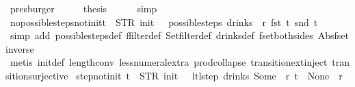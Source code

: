 \begin{isabellebody}
\ presburger\isanewline
\ \ \isamarkupfalse%
\ \isamarkupfalse%
\ {\isacharquery}thesis\isanewline
\ \ \ \ \isamarkupfalse%
\ simp\isanewline
{}\isamarkupfalse%
%
\endisatagproof
{\isafoldproof}%
%
\isadelimproof
\isanewline
%
\endisadelimproof
\isanewline
{}\isamarkupfalse%
\ no{\isacharunderscore}possible{\isacharunderscore}steps{\isacharunderscore}not{\isacharunderscore}init{\isacharcolon}{\isachardoublequoteopen}t\ {\isasymnoteq}\ {\isacharparenleft}STR\ {\isacharprime}{\isacharprime}init{\isacharprime}{\isacharprime}{\isacharcomma}\ {\isacharbrackleft}{\isacharbrackright}{\isacharparenright}\ {\isasymLongrightarrow}\ possible{\isacharunderscore}steps\ drinks\ {}\ r\ {\isacharparenleft}fst\ t{\isacharparenright}\ {\isacharparenleft}snd\ t{\isacharparenright}\ {\isacharequal}\ {\isacharbraceleft}{\isacharbar}{\isacharbar}{\isacharbraceright}{\isachardoublequoteclose}\isanewline
%
\isadelimproof
\ \ %
\endisadelimproof
%
\isatagproof
{}\isamarkupfalse%
\ {\isacharparenleft}simp\ add{\isacharcolon}\ possible{\isacharunderscore}steps{\isacharunderscore}def\ ffilter{\isacharunderscore}def\ Set{\isachardot}filter{\isacharunderscore}def\ drinks{\isacharunderscore}def\ fset{\isacharunderscore}both{\isacharunderscore}sides\ Abs{\isacharunderscore}fset{\isacharunderscore}inverse{\isacharparenright}\isanewline
\ \ \isamarkupfalse%
\ {\isacharparenleft}metis\ init{\isacharunderscore}def\ length{\isacharunderscore}{}{\isacharunderscore}conv\ less{\isacharunderscore}numeral{\isacharunderscore}extra{\isacharparenleft}{}{\isacharparenright}\ prod{\isachardot}collapse\ transition{\isachardot}ext{\isacharunderscore}inject\ transition{\isachardot}surjective{\isacharparenright}%
\endisatagproof
{\isafoldproof}%
%
\isadelimproof
\isanewline
%
\endisadelimproof
\isanewline
{}\isamarkupfalse%
\ step{\isacharunderscore}not{\isacharunderscore}init{\isacharcolon}\ {\isachardoublequoteopen}t\ {\isasymnoteq}\ {\isacharparenleft}STR\ {\isacharprime}{\isacharprime}init{\isacharprime}{\isacharprime}{\isacharcomma}\ {\isacharbrackleft}{\isacharbrackright}{\isacharparenright}\ {\isasymLongrightarrow}\ ltl{\isacharunderscore}step\ drinks\ {\isacharparenleft}Some\ {}{\isacharparenright}\ r\ t\ {\isacharequal}\ {\isacharparenleft}None{\isacharcomma}\ {\isacharbrackleft}{\isacharbrackright}{\isacharcomma}\ r{\isacharparenright}{\isachardoublequoteclose}\isanewline
%
\isadelimproof
\ \ %
\endisadelimproof
%
\isatagproof

\end{isabellebody}
